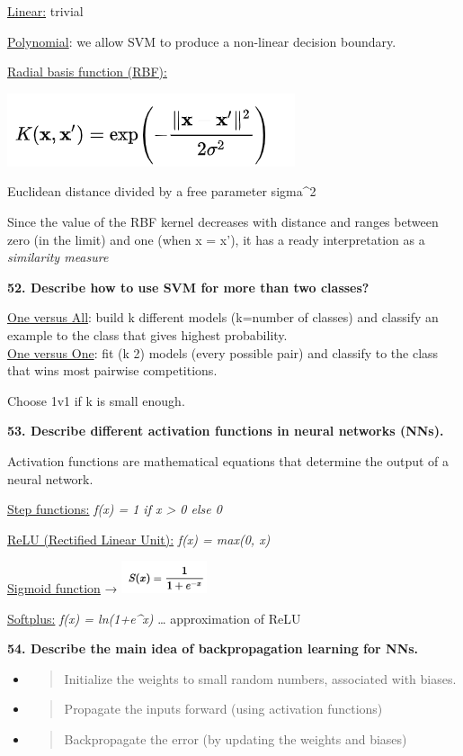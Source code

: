 \underline{Linear:} trivial

\underline{Polynomial}: we allow SVM to produce a non-linear decision
boundary.

\underline{Radial basis function (RBF):}

\includegraphics[width=3.33333in,height=0.84375in]{media/image30.png}

Euclidean distance divided by a free parameter sigma\^{}2

Since the value of the RBF kernel decreases with distance and ranges
between zero (in the limit) and one (when x = x'), it has a ready
interpretation as a \emph{similarity measure}

\textbf{52. Describe how to use SVM for more than two classes?}

\underline{One versus All}: build k different models (k=number of
classes) and classify an example to the class that gives highest
probability.\\
\underline{One versus One}: fit (k 2) models (every possible pair) and
classify to the class that wins most pairwise competitions.

Choose 1v1 if k is small enough.

\textbf{53. Describe different activation functions in neural networks
(NNs).}

Activation functions are mathematical equations that determine the
output of a neural network.

\underline{Step functions:} \emph{f(x) = 1 if x \textgreater{} 0 else 0}

\underline{ReLU (Rectified Linear Unit):} \emph{f(x) = max(0, x)}

\underline{Sigmoid function} →
\includegraphics[width=0.99219in,height=0.37256in]{media/image11.png}

\underline{Softplus:} \emph{f(x) = ln(1+e\^{}x)} \ldots{} approximation
of ReLU

\textbf{54. Describe the main idea of backpropagation learning for NNs.}

\begin{itemize}
\item
  \begin{quote}
  Initialize the weights to small random numbers, associated with
  biases.
  \end{quote}
\item
  \begin{quote}
  Propagate the inputs forward (using activation functions)
  \end{quote}
\item
  \begin{quote}
  Backpropagate the error (by updating the weights and biases)
  \end{quote}
\end{itemize}

